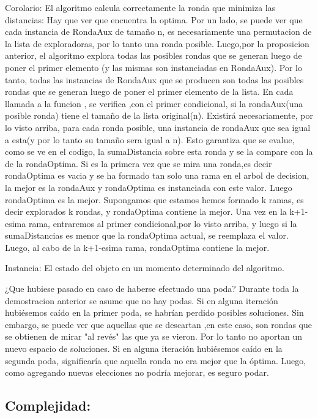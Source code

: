 \documentclass[10pt, a4paper]{article}
\begin{document}
Corolario: El algoritmo calcula correctamente la ronda que minimiza las distancias:
Hay que ver que encuentra la optima.
Por un lado, se puede ver que cada instancia de RondaAux de tamaño n,  es necesariamente una permutacion de la lista de exploradoras, por lo tanto una ronda posible. 
Luego,por la proposicion anterior, el algoritmo explora todas las posibles rondas que se generan luego de poner el primer elemento (y las mismas son instanciadas en RondaAux).
Por lo tanto, todas las instancias de RondaAux que se producen son todas las posibles rondas que se generan luego de poner el primer elemento de la lista.
En cada llamada a la funcion , se verifica ,con el primer condicional, si la rondaAux(una posible ronda) tiene el tamaño de la lista original(n). Existirá necesariamente, por lo visto arriba,  para cada ronda posible, una instancia de rondaAux que sea igual a esta(y por lo tanto su tamaño sera igual a n). Esto garantiza que se evalue, como se ve en el codigo, la sumaDistancia sobre esta ronda y se la compare con la de la  rondaOptima.
Si es la primera vez que se mira una ronda,es decir rondaOptima es vacia y se ha formado tan solo una rama en el arbol de decision, la mejor es la rondaAux y rondaOptima es instanciada con este valor. Luego rondaOptima es la mejor.
Supongamos que estamos hemos formado k ramas, es decir explorados k rondas, y rondaOptima contiene la mejor. Una vez en la k+1-esima rama, entraremos al primer condicional,por lo visto arriba, y luego si la sumaDistancias es menor que la rondaOptima actual, se reemplaza el valor. Luego, al cabo de la k+1-esima rama, rondaOptima contiene la mejor.

Instancia: El estado del objeto en un momento determinado del algoritmo.

¿Que hubiese pasado en caso de haberse efectuado una poda?
Durante toda la demostracion anterior se asume que no hay podas.
Si en alguna iteración hubiésemos caído en la primer poda, se habrían perdido posibles soluciones. Sin embargo, se puede ver que aquellas que se descartan ,en este caso, son rondas que se obtienen de mirar "al revés" las que ya se vieron. Por lo tanto no aportan un nuevo espacio de soluciones.
Si en alguna iteración hubiésemos caído en la segunda poda, significaría que aquella ronda no era mejor que la óptima. Luego, como agregando nuevas elecciones no podría mejorar, es seguro podar.


\subsection{Complejidad:}
\end{document}
